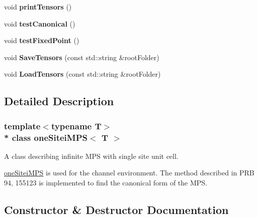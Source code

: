 \begin{DoxyCompactItemize}
\item 
void {\bfseries print\+Tensors} ()\hypertarget{classoneSiteiMPS_a9419f84b80b19fdd55c52e97317814ff}{}\label{classoneSiteiMPS_a9419f84b80b19fdd55c52e97317814ff}

\item 
void {\bfseries test\+Canonical} ()\hypertarget{classoneSiteiMPS_a6e30cf95686adc8e6e1f7d023ba02e82}{}\label{classoneSiteiMPS_a6e30cf95686adc8e6e1f7d023ba02e82}

\item 
void {\bfseries test\+Fixed\+Point} ()\hypertarget{classoneSiteiMPS_a27bf448675220b1b902b0c6b7aa8a7fd}{}\label{classoneSiteiMPS_a27bf448675220b1b902b0c6b7aa8a7fd}

\item 
void {\bfseries Save\+Tensors} (const std\+::string \&root\+Folder)\hypertarget{classoneSiteiMPS_ac0e8d708036a3bf5662ecf34c9ea7a4d}{}\label{classoneSiteiMPS_ac0e8d708036a3bf5662ecf34c9ea7a4d}

\item 
void {\bfseries Load\+Tensors} (const std\+::string \&root\+Folder)\hypertarget{classoneSiteiMPS_a714e1f7490902fd67741e8abe2f69c3c}{}\label{classoneSiteiMPS_a714e1f7490902fd67741e8abe2f69c3c}

\end{DoxyCompactItemize}


\subsection{Detailed Description}
\subsubsection*{template$<$typename T$>$\\*
class one\+Sitei\+M\+P\+S$<$ T $>$}

A class describing infinite M\+PS with single site unit cell. 

\hyperlink{classoneSiteiMPS}{one\+Sitei\+M\+PS} is used for the channel environment. The method described in P\+RB 94, 155123 is implemented to find the canonical form of the M\+PS. 

\subsection{Constructor \& Destructor Documentation}
